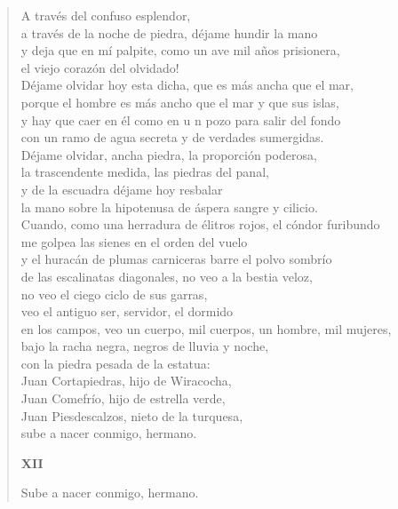 \documentclass[12pt]{article}
\begin{document}
\begin{verse}
A través del confuso esplendor,\\
a través de la noche de piedra, déjame hundir la mano\\
y deja que en mí palpite, como un ave mil años prisionera,\\
el viejo corazón del olvidado!\\
Déjame olvidar hoy esta dicha, que es más ancha que el mar,\\
porque el hombre es más ancho que el mar y que sus islas,\\
y hay que caer en él como en u n pozo para salir del fondo\\
con un ramo de agua secreta y de verdades sumergidas.\\
Déjame olvidar, ancha piedra, la proporción poderosa,\\
la trascendente medida, las piedras del panal,\\
y de la escuadra déjame hoy resbalar\\
la mano sobre la hipotenusa de áspera sangre y cilicio.\\
Cuando, como una herradura de élitros rojos, el cóndor furibundo\\
me golpea las sienes en el orden del vuelo\\
y el huracán de plumas carniceras barre el polvo sombrío\\
de las escalinatas diagonales, no veo a la bestia veloz,\\
no veo el ciego ciclo de sus garras,\\
veo el antiguo ser, servidor, el dormido\\
en los campos, veo un cuerpo, mil cuerpos, un hombre, mil mujeres,\\
bajo la racha negra, negros de lluvia y noche,\\
con la piedra pesada de la estatua:\\
Juan Cortapiedras, hijo de Wiracocha,\\
Juan Comefrío, hijo de estrella verde,\\
Juan Piesdescalzos, nieto de la turquesa,\\
sube a nacer conmigo, hermano.  

{\bfseries\scshape {XII}}

Sube a nacer conmigo, hermano.  


\end{verse}
\end{document}
